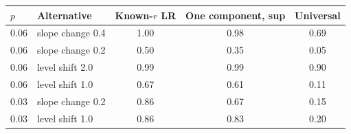 \begin{tabular}{llccc}
\toprule
$p$ & Alternative & Known-$r$ LR & One component, sup & Universal \\
\midrule
0.06 & slope change 0.4 & 1.00 & 0.98 & 0.69 \\
0.06 & slope change 0.2 & 0.50 & 0.35 & 0.05 \\
0.06 & level shift 2.0 & 0.99 & 0.99 & 0.90 \\
0.06 & level shift 1.0 & 0.67 & 0.61 & 0.11 \\
0.03 & slope change 0.2 & 0.86 & 0.67 & 0.15 \\
0.03 & level shift 1.0 & 0.86 & 0.83 & 0.20 \\
\bottomrule
\end{tabular}

